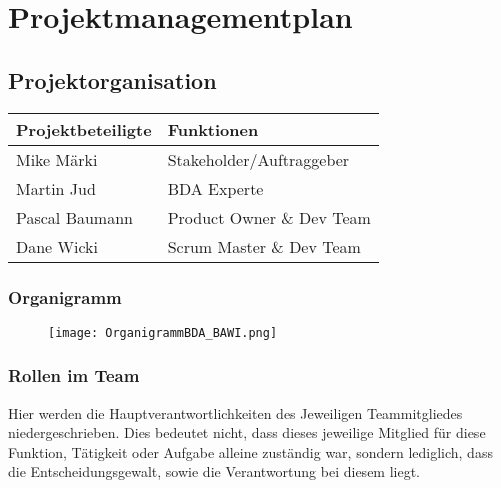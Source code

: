 \chapter{Projektmanagementplan}

\section{Projektorganisation}

\vspace{1em}

\begin{tabularx}{\textwidth}{|X|X|}
	\hline
	\textbf{Projektbeteiligte} & \textbf{Funktionen} \\
	\hline
	Mike Märki & Stakeholder/Auftraggeber \\
	\hline
	Martin Jud & BDA Experte \\
	\hline
	Pascal Baumann & Product Owner \& Dev Team \\
	\hline
	Dane Wicki & Scrum Master \& Dev Team \\
	\hline
\end{tabularx}

\subsection{Organigramm}
\begin{figure}[h!]
	\centering
	\texttt{[image: OrganigrammBDA\_BAWI.png]}
\end{figure}

\subsection{Rollen im Team}
Hier werden die Hauptverantwortlichkeiten des Jeweiligen Teammitgliedes niedergeschrieben. Dies bedeutet nicht, dass dieses jeweilige Mitglied für diese Funktion, Tätigkeit oder Aufgabe alleine zuständig war, sondern lediglich, dass die Entscheidungsgewalt, sowie die Verantwortung bei diesem liegt.

